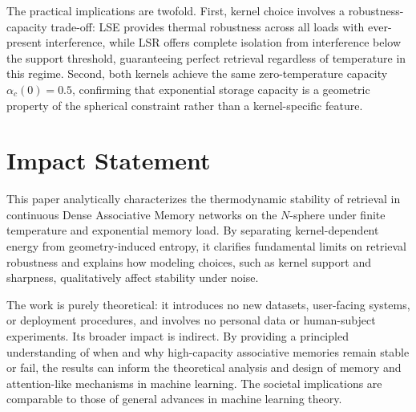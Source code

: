 \documentclass{article}
\theoremstyle{plain}
\theoremstyle{definition}
\theoremstyle{remark}
\begin{document}
The practical implications are twofold. First, kernel choice involves a robustness-capacity trade-off: LSE provides thermal robustness across all loads with ever-present interference, while LSR offers complete isolation from interference below the support threshold, guaranteeing perfect retrieval regardless of temperature in this regime. Second, both kernels achieve the same zero-temperature capacity $\alpha_c(0) = 0.5$, confirming that exponential storage capacity is a geometric property of the spherical constraint rather than a kernel-specific feature.






\section*{Impact Statement}

This paper analytically characterizes the thermodynamic stability of retrieval in continuous Dense Associative Memory networks on the $N$-sphere under finite temperature and exponential memory load. By separating kernel-dependent energy from geometry-induced entropy, it clarifies fundamental limits on retrieval robustness and explains how modeling choices, such as kernel support and sharpness, qualitatively affect stability under noise.

The work is purely theoretical: it introduces no new datasets, user-facing systems, or deployment procedures, and involves no personal data or human-subject experiments. Its broader impact is indirect. By providing a principled understanding of when and why high-capacity associative memories remain stable or fail, the results can inform the theoretical analysis and design of memory and attention-like mechanisms in machine learning. The societal implications are comparable to those of general advances in machine learning theory.
\end{document}

